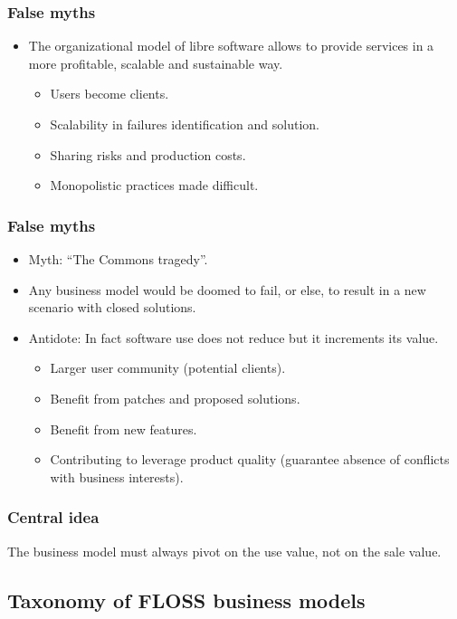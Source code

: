 \begin{frame}
 \frametitle{False myths}
\begin{itemize}
 \item The organizational model of libre software allows to provide services in a more profitable,
scalable and sustainable way.
\begin{itemize}
 \item \alert{Users} become \alert{clients}.
 \item \alert{Scalability} in failures identification and solution.
 \item \alert{Sharing risks} and production \alert{costs}.
 \item Monopolistic practices made \alert{difficult}.
\end{itemize}
\end{itemize}

\end{frame}

\begin{frame}
 \frametitle{False myths}
\begin{itemize}
 \item Myth: ``The Commons tragedy''.
 \item Any business model would be doomed to fail, or else, to result 
in a new scenario with closed solutions.
 \item Antidote: In fact \alert{software use} does not \alert{reduce} but it
\alert{increments its value}.
    \begin{itemize}
    \item Larger user community (potential clients).
    \item Benefit from patches and proposed solutions.
    \item Benefit from new features.
    \item Contributing to leverage product quality (guarantee absence of conflicts 
with business interests).
    \end{itemize}
\end{itemize}
\end{frame}

\begin{frame}
 \frametitle{Central idea}
\Large{The \alert{business model} must always pivot on the \alert{use value}, not on the
sale value.}
\end{frame}

\subsection{Taxonomy of FLOSS business models}


